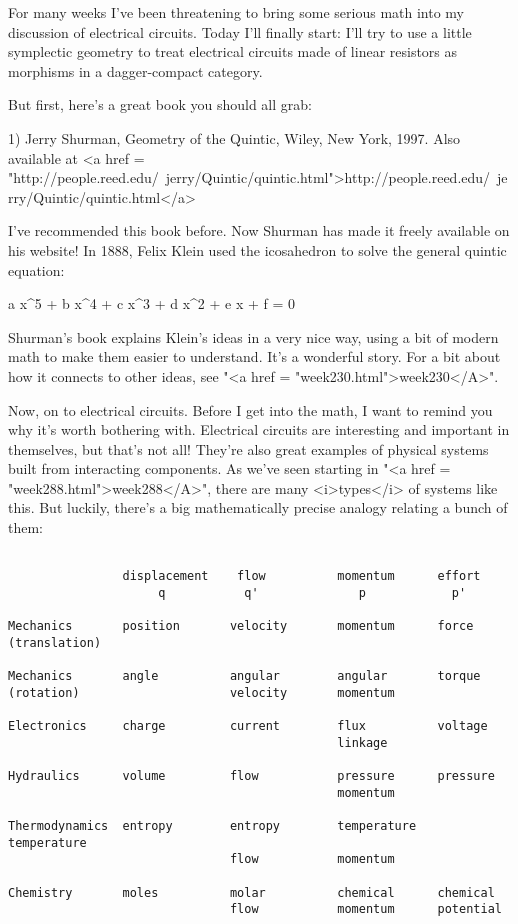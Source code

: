 

For many weeks I've been threatening to bring some serious math into
my discussion of electrical circuits.  Today I'll finally start: I'll
try to use a little symplectic geometry to treat electrical circuits
made of linear resistors as morphisms in a dagger-compact category.

But first, here's a great book you should all grab:

1) Jerry Shurman, Geometry of the Quintic, Wiley, New York, 1997. 
Also available at <a href = "http://people.reed.edu/~jerry/Quintic/quintic.html">http://people.reed.edu/~jerry/Quintic/quintic.html</a>

I've recommended this book before.  Now Shurman has made it
freely available on his website!  In 1888, Felix Klein used the
icosahedron to solve the general quintic equation:


 a x^{5} + b x^{4} + c x^{3} + d
x^{2} + e x + f = 0

Shurman's book explains Klein's ideas in a very nice way, using a
bit of modern math to make them easier to understand.  It's a
wonderful story.  For a bit about how it connects to other ideas, see
"<a href = "week230.html">week230</A>".

Now, on to electrical circuits.  Before I get into the math, I want to
remind you why it's worth bothering with.  Electrical circuits are
interesting and important in themselves, but that's not all!  They're
also great examples of physical systems built from interacting
components.  As we've seen starting in "<a href =
"week288.html">week288</A>", there are many <i>types</i> of systems
like this.  But luckily, there's a big mathematically precise analogy
relating a bunch of them:



\begin{verbatim}

                displacement    flow          momentum      effort
                     q           q'              p            p'

Mechanics       position       velocity       momentum      force
(translation)

Mechanics       angle          angular        angular       torque
(rotation)                     velocity       momentum

Electronics     charge         current        flux          voltage
                                              linkage

Hydraulics      volume         flow           pressure      pressure
                                              momentum

Thermodynamics  entropy        entropy        temperature   temperature
                               flow           momentum

Chemistry       moles          molar          chemical      chemical
                               flow           momentum      potential
\end{verbatim}
    

